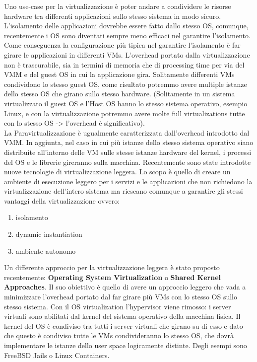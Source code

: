 \documentclass{article}
\begin{document}
Uno use-case per la virtualizzazione è poter andare a condividere le risorse hardware tra differenti applicazioni sullo stesso sistema in modo sicuro. L'isolamento delle applicazioni dovrebbe essere fatto dallo stesso OS, comunque, recentemente i OS sono diventati sempre meno efficaci nel garantire l'isolamento. Come conseguenza la configurazione più tipica nel garantire l'isolamento è far girare le applicazioni in differenti VMs. L'overhead portato dalla virtualizzazione non è trascurabile, sia in termini di memoria che di processing time per via del VMM e del guest OS in cui la applicazione gira. Solitamente differenti VMs condividono lo stesso guest OS, come risultato potremmo avere multiple istanze dello stesso OS che girano sullo stesso hardware. (Solitamente in un sistema virtualizzato il guest OS e l'Host OS hanno lo stesso sistema operativo, esempio Linux, e con la virtualizzazione potremmo avere molte full virtualizations tutte con lo stesso OS -> l'overhead è significativo).
\\
La Paravirtualizzazione è ugualmente caratterizzata dall'overhead introdotto dal VMM. In aggiunta, nel caso in cui più istanze dello stesso sistema operativo siano distribuite all'interno delle VM sulle stesse istanze hardware del kernel, i processi del OS e le librerie gireranno sulla macchina. Recentemente sono state introdotte nuove tecnologie di virtualizzazione leggera. Lo scopo è quello di creare un ambiente di esecuzione leggero per i servizi e le applicazioni che non richiedono la virtualizzazione dell'intero sistema ma riescano comunque a garantire gli stessi vantaggi della virtualizzazione ovvero:
\begin{enumerate}
    \item isolamento
    \item dynamic instantiation
    \item ambiente autonomo
\end{enumerate}
Un differente approccio per la virtualizzazione leggera è stato proposto recentemente: \textbf{Operating System Virtualization} o \textbf{Shared Kernel Approaches}. Il suo obiettivo è quello di avere un approccio leggero che vada a minimizzare l'overhead portato dal far girare più VMs con lo stesso OS sullo stesso sistema. Con il OS virtualization l'hypervisor viene rimosso: i server virtuali sono abilitati dal kernel del sistema operativo della macchina fisica. Il kernel del OS è condiviso tra tutti i server virtuali che girano su di esso e dato che questo è condiviso tutte le VMs condivideranno lo stesso OS, che dovrà implementare le istanze dello user space logicamente distinte. Degli esempi sono FreeBSD Jails o Linux Containers.
\end{document}
